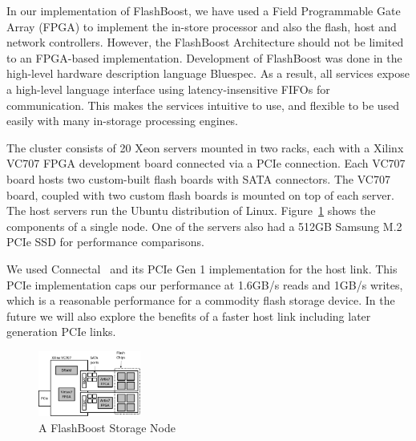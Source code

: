 
In our implementation of FlashBoost, we have used a Field Programmable Gate
Array (FPGA) to implement the in-store processor and also the flash, host and
network controllers. However, the FlashBoost Architecture should not be limited
to an FPGA-based implementation.  Development of FlashBoost was done in the
high-level hardware description language Bluespec. As a result, all services
expose a high-level language interface using latency-insensitive FIFOs for
communication. This makes the services intuitive to use, and flexible to be used
easily with many in-storage processing engines.

The cluster consists of 20 Xeon servers mounted in two racks, each with a Xilinx
VC707 FPGA development board connected via a PCIe connection. Each VC707 board
hosts two custom-built flash boards with SATA connectors. The VC707 board,
coupled with two custom flash boards is mounted on top of each server.
The host servers run the Ubuntu distribution of Linux.
Figure~\ref{fig:bluedbmnode} shows the components of a single node.
One of the servers also had a 512GB Samsung M.2 PCIe SSD for performance
comparisons.

We used Connectal~\cite{connectal} and its PCIe Gen 1 implementation for the
host link. This PCIe implementation caps our performance at 1.6GB/s reads and
1GB/s writes, which is a reasonable performance for a commodity flash storage
device. In the future we will also explore the benefits of a faster host link
including later generation PCIe links.

\begin{figure}[ht]
	\begin{center}
	\includegraphics[width=0.3\textwidth]{figures/storagenode-crop.pdf}
	\caption{A FlashBoost Storage Node}
	\label{fig:bluedbmnode}
	\end{center}
\end{figure}


